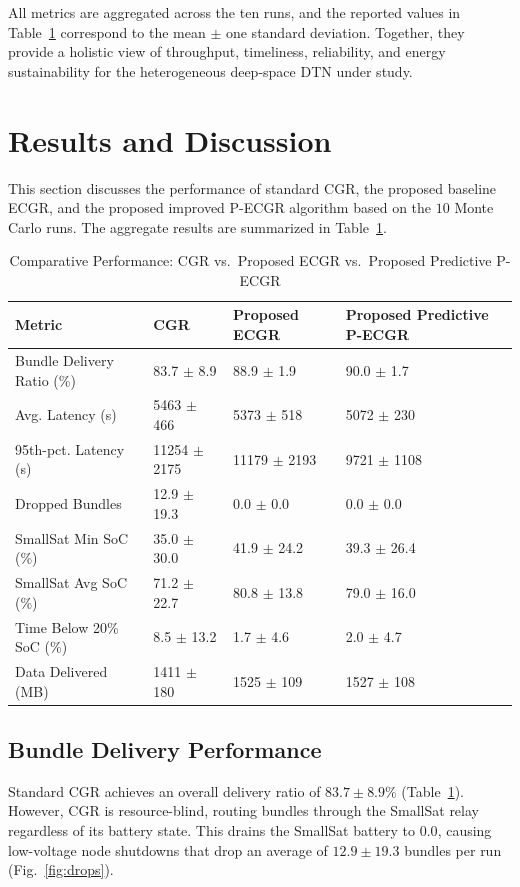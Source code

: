 \documentclass[a4paper,fleqn]{cas-dc}
\newcommand{\ecgr}{\textsf{ECGR}}
\newcommand{\cgr}{\textsf{CGR}}
\newcommand{\pecgr}{\textsf{P-ECGR}}
\begin{document}
All metrics are aggregated across the ten runs, and the reported values in Table~\ref{tab:results} correspond to the mean $\pm$ one standard deviation. Together, they provide a holistic view of throughput, timeliness, reliability, and energy sustainability for the heterogeneous deep‑space DTN under study.

\section{Results and Discussion}
\label{sec:results}

This section discusses the performance of standard \cgr{}, the proposed baseline \ecgr{}, and the proposed improved \pecgr{} algorithm based on the $10$ Monte Carlo runs. The aggregate results are summarized in Table~\ref{tab:results}.

\begin{table}[t]
\centering
\caption{Comparative Performance: CGR vs.\ Proposed ECGR vs.\ Proposed Predictive P-ECGR}
\label{tab:results}
\begin{tabular*}{\textwidth}{@{\extracolsep{\fill}}llll}
\hline
\textbf{Metric} & \textbf{CGR} & \textbf{Proposed ECGR} & \textbf{Proposed Predictive P-ECGR} \\
\hline
Bundle Delivery Ratio (\%) & 83.7 $\pm$ 8.9 & 88.9 $\pm$ 1.9 & 90.0 $\pm$ 1.7 \\
Avg. Latency (s) & 5463 $\pm$ 466 & 5373 $\pm$ 518 & 5072 $\pm$ 230 \\
95th-pct. Latency (s) & 11254 $\pm$ 2175 & 11179 $\pm$ 2193 & 9721 $\pm$ 1108 \\
Dropped Bundles & 12.9 $\pm$ 19.3 & 0.0 $\pm$ 0.0 & 0.0 $\pm$ 0.0 \\
SmallSat Min SoC (\%) & 35.0 $\pm$ 30.0 & 41.9 $\pm$ 24.2 & 39.3 $\pm$ 26.4 \\
SmallSat Avg SoC (\%) & 71.2 $\pm$ 22.7 & 80.8 $\pm$ 13.8 & 79.0 $\pm$ 16.0 \\
Time Below 20\% SoC (\%) & 8.5 $\pm$ 13.2 & 1.7 $\pm$ 4.6 & 2.0 $\pm$ 4.7 \\
Data Delivered (MB) & 1411 $\pm$ 180 & 1525 $\pm$ 109 & 1527 $\pm$ 108 \\
\hline
\end{tabular*}
\end{table}

\subsection{Bundle Delivery Performance}
Standard \cgr{} achieves an overall delivery ratio of $83.7 \pm 8.9\%$ (Table~\ref{tab:results}). However, \cgr{} is resource-blind, routing bundles through the SmallSat relay regardless of its battery state. This drains the SmallSat battery to $0.0$, causing low-voltage node shutdowns that drop an average of $12.9 \pm 19.3$ bundles per run (Fig.~\ref{fig:drops}). 
\end{document}
